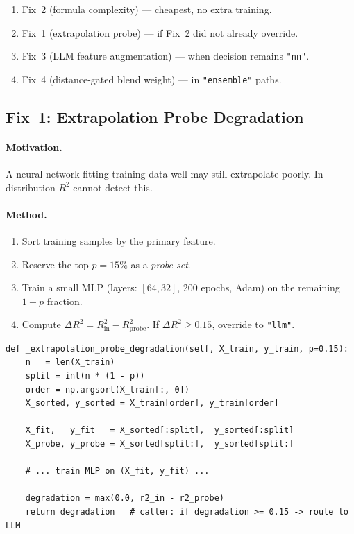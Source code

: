 \documentclass[twoside,11pt]{article}
\begin{document}
\begin{enumerate}
  \item Fix~2 (formula complexity) — cheapest, no extra training.
  \item Fix~1 (extrapolation probe) — if Fix~2 did not already override.
  \item Fix~3 (LLM feature augmentation) — when decision remains \texttt{"nn"}.
  \item Fix~4 (distance-gated blend weight) — in \texttt{"ensemble"} paths.
\end{enumerate}

\subsection{Fix~1: Extrapolation Probe Degradation}

\paragraph{Motivation.}
A neural network fitting training data well may still extrapolate poorly.
In-distribution $R^2$ cannot detect this.

\paragraph{Method.}

\begin{enumerate}
  \item Sort training samples by the primary feature.
  \item Reserve the top $p = 15\%$ as a \emph{probe set}.
  \item Train a small MLP (layers: $[64, 32]$, 200 epochs, Adam) on the
        remaining $1-p$ fraction.
  \item Compute $\Delta R^2 = R^2_{\text{in}} - R^2_{\text{probe}}$.
        If $\Delta R^2 \geq 0.15$, override to \texttt{"llm"}.
\end{enumerate}

\begin{lstlisting}[caption={Extrapolation probe core logic.}]
def _extrapolation_probe_degradation(self, X_train, y_train, p=0.15):
    n   = len(X_train)
    split = int(n * (1 - p))
    order = np.argsort(X_train[:, 0])
    X_sorted, y_sorted = X_train[order], y_train[order]

    X_fit,   y_fit   = X_sorted[:split],  y_sorted[:split]
    X_probe, y_probe = X_sorted[split:],  y_sorted[split:]

    # ... train MLP on (X_fit, y_fit) ...

    degradation = max(0.0, r2_in - r2_probe)
    return degradation   # caller: if degradation >= 0.15 -> route to LLM
\end{lstlisting}
\end{document}
